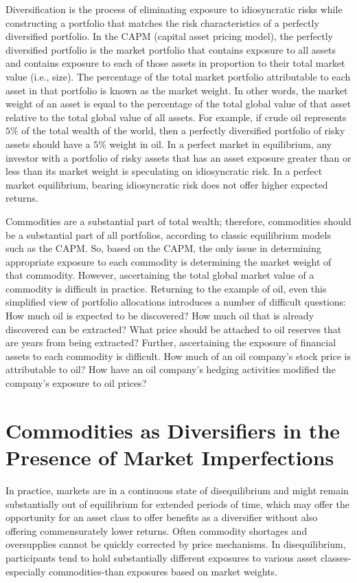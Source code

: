 \documentclass[11pt]{article}
\begin{document}
Diversification is the process of eliminating exposure to idiosyncratic risks while constructing a portfolio that matches the risk characteristics of a perfectly diversified portfolio. In the CAPM (capital asset pricing model), the perfectly diversified portfolio is the market portfolio that contains exposure to all assets and contains exposure to each of those assets in proportion to their total market value (i.e., size). The percentage of the total market portfolio attributable to each asset in that portfolio is known as the market weight. In other words, the market weight of an asset is equal to the percentage of the total global value of that asset relative to the total global value of all assets. For example, if crude oil represents $5 \%$ of the total wealth of the world, then a perfectly diversified portfolio of risky assets should have a $5 \%$ weight in oil. In a perfect market in equilibrium, any investor with a portfolio of risky assets that has an asset exposure greater than or less than its market weight is speculating on idiosyncratic risk. In a perfect market equilibrium, bearing idiosyncratic risk does not offer higher expected returns.

Commodities are a substantial part of total wealth; therefore, commodities should be a substantial part of all portfolios, according to classic equilibrium models such as the CAPM. So, based on the CAPM, the only issue in determining appropriate exposure to each commodity is determining the market weight of that commodity. However, ascertaining the total global market value of a commodity is difficult in practice. Returning to the example of oil, even this simplified view of portfolio allocations introduces a number of difficult questions: How much oil is expected to be discovered? How much oil that is already discovered can be extracted? What price should be attached to oil reserves that are years from being extracted? Further, ascertaining the exposure of financial assets to each commodity is difficult. How much of an oil company's stock price is attributable to oil? How have an oil company's hedging activities modified the company's exposure to oil prices?

\section*{Commodities as Diversifiers in the Presence of Market Imperfections}
In practice, markets are in a continuous state of disequilibrium and might remain substantially out of equilibrium for extended periods of time, which may offer the opportunity for an asset class to offer benefits as a diversifier without also offering commensurately lower returns. Often commodity shortages and oversupplies cannot be quickly corrected by price mechanisms. In disequilibrium, participants tend to hold substantially different exposures to various asset classes-especially commodities-than exposures based on market weights.
\end{document}
